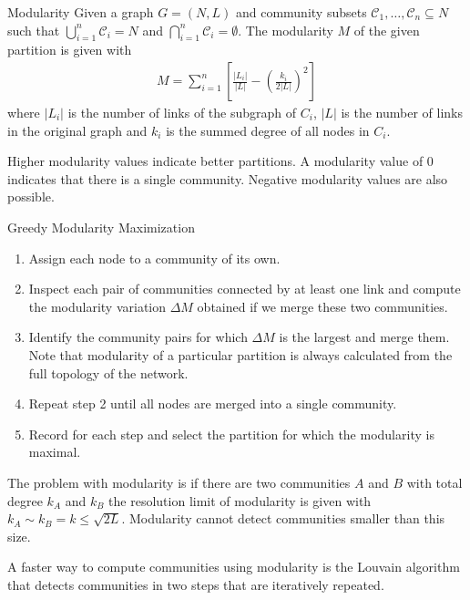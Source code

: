 \documentclass[english]{panikzettel}
\begin{document}
\begin{defi}{Modularity}
Given a graph $ G = (N,L) $ and community subsets $ \mathcal{C}_1, \dots, \mathcal{C}_n \subseteq N $ such that $ \bigcup_{i = 1}^{n} \mathcal{C}_i = N $ and $ \bigcap_{i = 1}^n \mathcal{C}_i = \emptyset $.
The modularity $ M $ of the given partition is given with
\begin{align*}
	M = \sum\limits_{i = 1}^{n} \left[\frac{|L_i|}{|L|} - \left(\frac{k_i}{2|L|}\right)^2\right]
\end{align*}
where $ |L_i| $ is the number of links of the subgraph of $ C_i $, $ |L| $ is the number of links in the original graph and $ k_i $ is the summed degree of all nodes in $ C_i $.
\end{defi}

Higher modularity values indicate better partitions.
A modularity value of 0 indicates that there is a single community.
Negative modularity values are also possible.

\begin{algo}{Greedy Modularity Maximization}
\begin{enumerate}
	\item Assign each node to a community of its own.
	\item Inspect each pair of communities connected by at least one link
	and compute the modularity variation $ \Delta M $ obtained if we merge
	these two communities.
	\item Identify the community pairs for which $ \Delta M $ is the largest and
	merge them. Note that modularity of a particular partition is always
	calculated from the full topology of the network.
	\item Repeat step 2 until all nodes are merged into a single
	community.
	\item Record for each step and select the partition for which the
	modularity is maximal.
\end{enumerate}
\end{algo}

The problem with modularity is if there are two communities $ A $ and $ B $ with total degree $ k_A $ and $ k_B $ the resolution limit of modularity is given with $ k_A \sim k_B = k \leq \sqrt{2L} $. 
Modularity cannot detect communities smaller than this size.

A faster way to compute communities using modularity is the Louvain algorithm that detects communities in two steps that are iteratively repeated.
\end{document}
